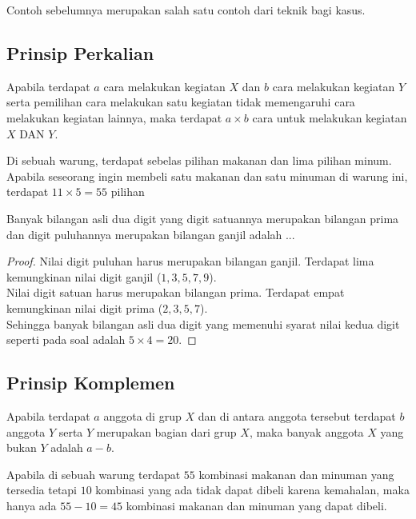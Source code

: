 \documentclass[11pt]{scrartcl}
\begin{document}
Contoh sebelumnya merupakan salah satu contoh dari teknik bagi kasus.

\subsection{Prinsip Perkalian}
Apabila terdapat $a$ cara melakukan kegiatan $X$ dan $b$ cara melakukan kegiatan $Y$ serta pemilihan cara melakukan satu kegiatan tidak memengaruhi cara melakukan kegiatan lainnya, maka terdapat $a \times b$ cara untuk melakukan kegiatan $X$ DAN $Y$.

\begin{example}
    Di sebuah warung, terdapat sebelas pilihan makanan dan lima pilihan minum. Apabila seseorang ingin membeli satu makanan dan satu minuman di warung ini, terdapat $11\times 5 = 55$ pilihan
\end{example}

\begin{example}
    Banyak bilangan asli dua digit yang digit satuannya merupakan bilangan prima dan digit puluhannya merupakan bilangan ganjil adalah ...
\end{example}

\begin{proof}
    Nilai digit puluhan harus merupakan bilangan ganjil. Terdapat lima kemungkinan nilai digit ganjil ($1, 3, 5, 7, 9$).\\
    Nilai digit satuan harus merupakan bilangan prima. Terdapat empat kemungkinan nilai digit prima ($2, 3, 5, 7$). \\
    Sehingga banyak bilangan asli dua digit yang memenuhi syarat nilai kedua digit seperti pada soal adalah $5 \times 4 = 20$.
\end{proof}

\subsection{Prinsip Komplemen}
Apabila terdapat $a$ anggota di grup $X$ dan di antara anggota tersebut terdapat $b$ anggota $Y$ serta $Y$ merupakan bagian dari grup $X$, maka banyak anggota $X$ yang bukan $Y$ adalah $a - b$.

\begin{example}
    Apabila di sebuah warung terdapat $55$ kombinasi makanan dan minuman yang tersedia tetapi $10$ kombinasi yang ada tidak dapat dibeli karena kemahalan, maka hanya ada $55 - 10 = 45$ kombinasi makanan dan minuman yang dapat dibeli.
\end{example}
\end{document}
